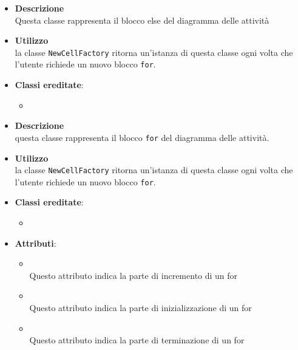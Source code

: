 \label{\nogloxy{swedesigner::client::model::celltypes::activity::HxElse}}
\begin{itemize}
\item \textbf{Descrizione}\\
Questa classe rappresenta il blocco else del diagramma delle attività
\item \textbf{Utilizzo}\\
la classe \texttt{NewCellFactory} ritorna un'istanza di questa classe ogni volta che l'utente richiede un nuovo blocco \texttt{for}.
\item \textbf{Classi ereditate}:
\begin{itemize}
\item \hyperref[\nogloxy{swedesigner::client::model::celltypes::activity::ActivityDiagramElement}]{}
\end{itemize}
\end{itemize}

\label{\nogloxy{swedesigner::client::model::celltypes::activity::HxFor}}
\begin{itemize}
\item \textbf{Descrizione}\\
questa classe rappresenta il blocco \texttt{for} del diagramma delle attività.
\item \textbf{Utilizzo}\\
la classe \texttt{NewCellFactory} ritorna un'istanza di questa classe ogni volta che l'utente richiede un nuovo blocco \texttt{for}.
\item \textbf{Classi ereditate}:
\begin{itemize}
\item \hyperref[\nogloxy{swedesigner::client::model::celltypes::activity::ActivityDiagramElement}]{}
\end{itemize}
\item \textbf{Attributi}:
\begin{itemize}
\item {}
\\ Questo attributo indica la parte di incremento di un for
\item {}
\\ Questo attributo indica la parte di inizializzazione di un for
\item {}
\\ Questo attributo indica la parte di terminazione di un for
\end{itemize}
\end{itemize}

